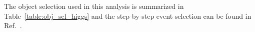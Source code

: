The object selection used in this analysis is summarized in Table~\ref{table:obj_sel_higgs} and the step-by-step event selection can be found in Ref.~\cite{HIG_19_001}.
